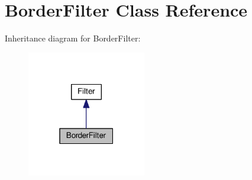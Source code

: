 \hypertarget{classModel_1_1BorderFilter}{}\section{Border\+Filter Class Reference}
\label{classModel_1_1BorderFilter}


Inheritance diagram for Border\+Filter\+:
\nopagebreak
\begin{figure}[H]
\begin{center}
\leavevmode
\includegraphics[width=147pt]{classModel_1_1BorderFilter__inherit__graph}
\end{center}
\end{figure}
